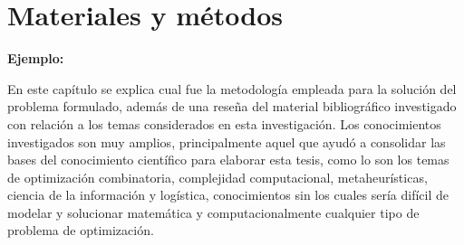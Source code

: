 \chapter{Materiales y métodos}

{\bf Ejemplo:}\par

En este capítulo se explica cual fue la metodología empleada para la solución del problema formulado, además de una reseña del material bibliográfico investigado con relación a los temas considerados en esta investigación. Los conocimientos investigados son muy amplios, principalmente aquel que ayudó a consolidar las bases del conocimiento científico para elaborar esta tesis, como lo son los temas de optimización combinatoria, complejidad computacional, metaheurísticas, ciencia de la información y logística, conocimientos sin los cuales sería difícil de modelar y solucionar matemática y computacionalmente cualquier tipo de problema de optimización.
